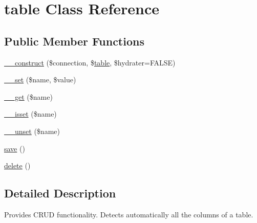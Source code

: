 \hypertarget{classtable}{
\section{table Class Reference}
\label{classtable}
}
\subsection*{Public Member Functions}
\begin{DoxyCompactItemize}
\item 
\hyperlink{classtable_a68a3e1f2e0983938fba508b288564ee6}{\_\-\_\-construct} (\$connection, \$\hyperlink{classtable}{table}, \$hydrater=FALSE)
\item 
\hyperlink{classtable_a83c2703c91959192f759992ad5640b67}{\_\-\_\-set} (\$name, \$value)
\item 
\hyperlink{classtable_abc8e9e31bb15c8a44c3210ec551407c8}{\_\-\_\-get} (\$name)
\item 
\hyperlink{classtable_a8f132f051b7cd7d570ccb9f6e2bb4201}{\_\-\_\-isset} (\$name)
\item 
\hyperlink{classtable_a8a93654c7bfe3f0a9bb7af531e513d44}{\_\-\_\-unset} (\$name)
\item 
\hyperlink{classtable_afc8a3c62679cf00ade9f15fb2a6d6132}{save} ()
\item 
\hyperlink{classtable_a13bdffdd926f26b825ea57066334ff01}{delete} ()
\end{DoxyCompactItemize}


\subsection{Detailed Description}
Provides CRUD functionality. Detects automatically all the columns of a table. 

